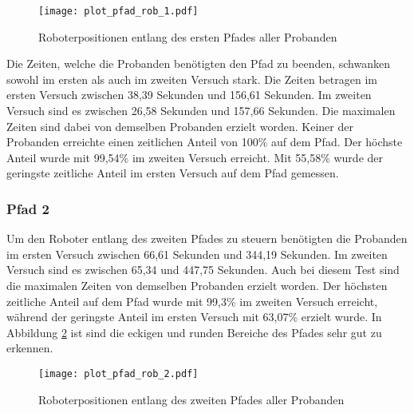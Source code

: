 \begin{figure}[H]
	\centering
	\texttt{[image: plot\_pfad\_rob\_1.pdf]}
	\caption{Roboterpositionen entlang des ersten Pfades aller Probanden}
	\label{fig:plot_pfad_rob_1}
\end{figure}

Die Zeiten, welche die Probanden benötigten den Pfad zu beenden, schwanken sowohl im ersten als auch im zweiten Versuch stark. Die Zeiten betragen im ersten Versuch zwischen 38,39 Sekunden und 156,61 Sekunden. Im zweiten Versuch sind es zwischen 26,58 Sekunden und 157,66 Sekunden. Die maximalen Zeiten sind dabei von demselben Probanden erzielt worden. Keiner der Probanden erreichte einen zeitlichen Anteil von 100\% auf dem Pfad. Der höchste Anteil wurde mit 99,54\% im zweiten Versuch erreicht. Mit 55,58\% wurde der geringste zeitliche Anteil im ersten Versuch auf dem Pfad gemessen.

\subsubsection{Pfad 2}

Um den Roboter entlang des zweiten Pfades zu steuern benötigten die Probanden im ersten Versuch zwischen 66,61 Sekunden und 344,19 Sekunden. Im zweiten Versuch sind es zwischen 65,34 und 447,75 Sekunden. Auch bei diesem Test sind die maximalen Zeiten von demselben Probanden erzielt worden. Der höchsten zeitliche Anteil auf dem Pfad wurde mit 99,3\% im zweiten Versuch erreicht, während der geringste Anteil im ersten Versuch mit 63,07\% erzielt wurde. In Abbildung \ref{fig:plot_pfad_rob_2} ist sind die eckigen und runden Bereiche des Pfades sehr gut zu erkennen.

\begin{figure}[H]
	\centering
	\texttt{[image: plot\_pfad\_rob\_2.pdf]}
	\caption{Roboterpositionen entlang des zweiten Pfades aller Probanden}
	\label{fig:plot_pfad_rob_2}
\end{figure}

